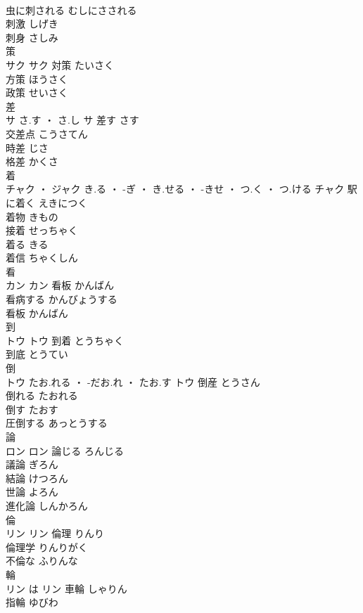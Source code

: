 \documentclass[8pt]{extreport}
\begin{document}
\begin{CJK}{UTF8}{min}
\\	虫に刺される	むしにさされる	
\\	刺激	しげき	
\\	刺身	さしみ	
\\	策	
\\	サク		サク	対策	たいさく	
\\	方策	ほうさく	
\\	政策	せいさく	
\\	差	
\\	サ	さ.す ・ さ.し	サ	差す	さす	
\\	交差点	こうさてん	
\\	時差	じさ	
\\	格差	かくさ	
\\	着	
\\	チャク ・ ジャク	き.る ・ -ぎ ・ き.せる ・ -きせ ・ つ.く ・ つ.ける	チャク	駅に着く	えきにつく	
\\	着物	きもの	
\\	接着	せっちゃく	
\\	着る	きる	
\\	着信	ちゃくしん	
\\	看	
\\	カン		カン	看板	かんばん	
\\	看病する	かんびょうする	
\\	看板	かんばん	
\\	到	
\\	トウ		トウ	到着	とうちゃく	
\\	到底	とうてい	
\\	倒	
\\	トウ	たお.れる ・ -だお.れ ・ たお.す	トウ	倒産	とうさん	
\\	倒れる	たおれる	
\\	倒す	たおす	
\\	圧倒する	あっとうする	
\\	論	
\\	ロン		ロン	論じる	ろんじる	
\\	議論	ぎろん	
\\	結論	けつろん	
\\	世論	よろん	
\\	進化論	しんかろん	
\\	倫	
\\	リン		リン	倫理	りんり	
\\	倫理学	りんりがく	
\\	不倫な	ふりんな	
\\	輪	
\\	リン	は	リン	車輪	しゃりん	
\\	指輪	ゆびわ	

\end{CJK}
\end{document}
